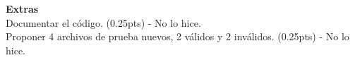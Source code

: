 \documentclass[11pt]{report}
\begin{document}
\textbf{Extras} \\

Documentar el código. (0.25pts) - No lo hice. \\

Proponer 4 archivos de prueba nuevos, 2 válidos y 2 inválidos. (0.25pts) - No lo hice. \\
\end{document}
